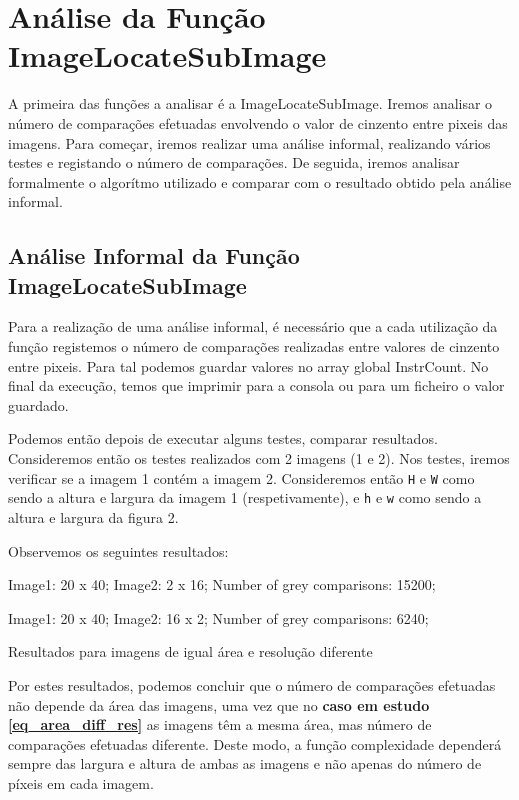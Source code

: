 \renewcommand{\listingscaption}{Caso em estudo:}
\chapter{Análise da Função ImageLocateSubImage}
A primeira das funções a analisar é a ImageLocateSubImage. Iremos analisar o número de comparações efetuadas envolvendo
o valor de cinzento entre pixeis das imagens. Para começar, iremos realizar uma análise informal, realizando vários
testes e registando o número de comparações. De seguida, iremos analisar formalmente o algorítmo utilizado e comparar
com o resultado obtido pela análise informal.

\section{Análise Informal da Função ImageLocateSubImage
\label{informal_locate}}
Para a realização de uma análise informal, é necessário que a cada utilização da função registemos o número de
comparações realizadas entre valores de cinzento entre pixeis. Para tal podemos guardar valores no array global
InstrCount. No final da execução, temos que imprimir para a consola ou para um ficheiro o valor guardado.  

Podemos então depois de executar alguns testes, comparar resultados. Consideremos então os testes realizados com 2
imagens (1 e 2). Nos testes, iremos verificar se a imagem 1
contém a imagem 2. Consideremos então \verb|H| e \verb|W|
como sendo a altura e
largura da imagem 1 (respetivamente), e \verb|h| e \verb|w|
como sendo a altura e largura da figura 2.

Observemos os seguintes resultados:
\begin{listing}[H]
\centering
Image1: 20 x 40;	Image2: 2 x 16;	Number of grey comparisons: 15200;

Image1: 20 x 40;	Image2: 16 x 2;	Number of grey comparisons: 6240;
\caption{Resultados para imagens de igual área e resolução
diferente}
\label{eq_area_diff_res}
\end{listing}

Por estes resultados, podemos concluir que o número de
comparações efetuadas não depende da área das imagens, uma
vez que no \textbf{caso em estudo \ref{eq_area_diff_res}} as 
imagens têm a mesma área, mas número de comparações efetuadas 
diferente. Deste modo, a função complexidade dependerá sempre das
largura e altura de ambas as imagens e não apenas do número
de píxeis em cada imagem.

